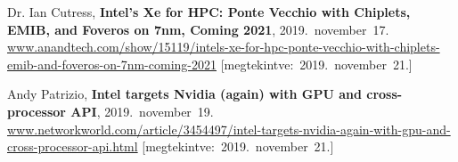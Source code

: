 \begin{thebibliography}{9}
	Dr. Ian Cutress,
	\textbf{Intel’s Xe for HPC: Ponte Vecchio with Chiplets, EMIB, and Foveros on 7nm, Coming 2021},
	2019.~november~17.
	{\footnotesize\url{www.anandtech.com/show/15119/intels-xe-for-hpc-ponte-vecchio-with-chiplets-emib-and-foveros-on-7nm-coming-2021}}
	[megtekintve:~2019.~november~21.]

	Andy Patrizio,
	\textbf{Intel targets Nvidia (again) with GPU and cross-processor API},
	2019.~november~19.
	{\footnotesize\url{www.networkworld.com/article/3454497/intel-targets-nvidia-again-with-gpu-and-cross-processor-api.html}}
	[megtekintve:~2019.~november~21.]

\end{thebibliography}